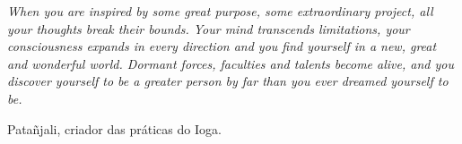 \vspace*{15.0 cm}

\textit{When you are inspired by some great purpose, some extraordinary project, all your thoughts break their bounds. Your mind transcends limitations, your consciousness expands in every direction and you find yourself in a new, great and wonderful world. Dormant forces, faculties and talents become alive, and you discover yourself to be a greater person by far than you ever dreamed yourself to be.}

\begin{flushright}

Patañjali, criador das práticas do Ioga.

\end{flushright}